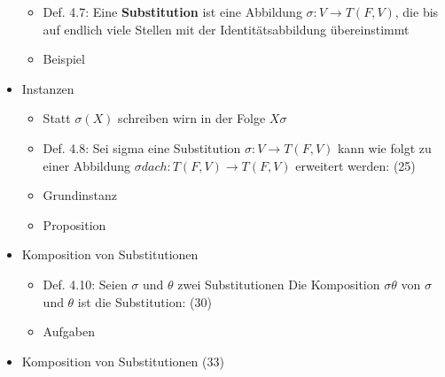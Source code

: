 \begin{itemize}
	\begin{itemize}
		\item Def. 4.7: Eine \textbf{Substitution} ist eine Abbildung 					\begin{math} \sigma : V \to T(F,V)\end{math}, die bis auf 					endlich viele Stellen mit der Identitätsabbildung 							übereinstimmt
		\item Beispiel
	\end{itemize}
	\item Instanzen
	\begin{itemize}
		\item Statt \begin{math} \sigma(X) \end{math} schreiben wirn in 				der Folge \begin{math} X\sigma \end{math}
		\item Def. 4.8: Sei sigma eine Substitution \begin{math} \sigma 				: V \to T(F,V)\end{math} kann wie folgt zu einer Abbildung 					\begin{math} \sigma dach: T(F,V) \to T(F,V)\end{math} 						erweitert werden: (25)
		\item Grundinstanz
		\item Proposition
	\end{itemize}
	\item Komposition von Substitutionen
	\begin{itemize}
		\item Def. 4.10: Seien \(\sigma\) und \(\theta\) zwei 							Substitutionen Die 	Komposition \(\sigma\theta\) von 						\(\sigma\) und \(\theta\) ist die Substitution: (30)
		\item Aufgaben
	\end{itemize}
	\item Komposition von Substitutionen (33)
\end{itemize}
